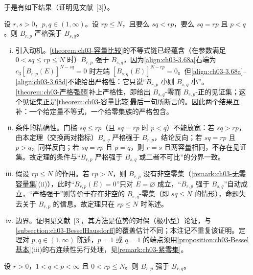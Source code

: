 \documentclass[../../main.tex]{subfiles}%
\begin{document}
于是有如下结果（证明见文献~[3]）。

\begin{theorem}\label{theorem:ch03-严格强弱}
设 $r,s>0$，$p,q\in(1,\infty)$。设 $rp\leqslant N$，且要么 $sq<rp$，要么 $sq=rp$ 且 $p<q$。则 $B_{r,p}$ 严格强于 $B_{s,q}$。
\end{theorem}

\begin{remark}\label{remark:ch03-严格强弱动机}
\begin{enumerate}[(i)]
\item 引入动机。\cref{theorem:ch03-容量比较}的不等式链已经蕴含（在参数满足 $0<sq\leqslant rp\leqslant N$ 时）$B_{r,p}$ 强于 $B_{s,q}$，因为\eqref{align:ch03-3.68a}右端为 $c_3[B_{r,p}(E)]^{N-sq}=0$ 时左端 $[B_{s,q}(E)]^{N-rp}=0$。但\eqref{align:ch03-3.68a}--\eqref{align:ch03-3.68d}不能给出严格性：它只说“$B_{r,p}$ 小则 $B_{s,q}$ 小”。\cref{theorem:ch03-严格强弱}补上严格性，即给出 $B_{s,q}$-零而 $B_{r,p}$-正的见证集；这个见证集正是\cref{theorem:ch03-容量比较}最后一句所断言的。因此两个结果互补：一个给定量不等式，一个给零集族的严格包含。
\item 条件的精确性。门槛 $sq\leqslant rp$（且 $sq=rp$ 时 $p<q$）不能放宽：若 $sq>rp$，由本定理（交换两对指标）$B_{s,q}$ 严格强于 $B_{r,p}$，结论反向；若 $sq=rp$ 且 $p>q$，同样反向；若 $sq=rp$ 且 $p=q$，则 $r=s$ 且两容量相同，不存在见证集。故定理的条件与“$B_{r,p}$ 严格强于 $B_{s,q}$ 或二者不可比”的分界一致。
\item 假设 $rp\leqslant N$ 的作用。若 $rp>N$，则 $B_{r,p}$ 没有非空零集（\cref{remark:ch03-无零容量集}(ii)），此时“$B_{r,p}(E)=0$”只对 $E=\varnothing$ 成立，“$B_{r,p}$ 强于 $B_{s,q}$”自动成立，“严格强于”则等价于存在非空的 $B_{s,q}$-零集（即 $sq\leqslant N$ 的情形），命题失去关于 $B_{r,p}$ 的信息。故定理只在 $rp\leqslant N$ 时陈述。
\item 边界。证明见文献~[3]，其方法是位势的对偶（极小型）论证，与\cref{subsection:ch03-BesselHausdorff}的覆盖估计不同；本注记不重复该证明。定理对 $p,q\in(1,\infty)$ 陈述，$p=1$ 或 $q=1$ 的端点须用\cref{proposition:ch03-Bessel基本}(iii)的右连续性另行处理，见\cref{remark:ch03-紧零集}。
\end{enumerate}
\end{remark}

\begin{corollary}\label{corollary:ch03-同阶强弱}
设 $r>0$，$1<q<p<\infty$ 且 $0<rp\leqslant N$。则 $B_{r,p}$ 强于 $B_{r,q}$。
\end{corollary}
\end{document}
